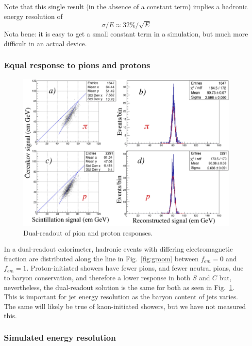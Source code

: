 Note that this single result (in the absence of a constant term) implies a hadronic energy resolution of
\begin{displaymath}
  \sigma / E \approx 32\% / \sqrt{E}
\end{displaymath}
Nota bene: it is easy to get a small constant term in a simulation, but much more difficult in an actual device.

\subsubsection{Equal response to pions and protons}
\label{sec:pi-p}

\begin{figure}
 \centering
 \includegraphics[width=.5\linewidth]{Calorimeter/DualReadout/f42-pion-proton.jpg}
 \caption{Dual-readout of pion and proton responses.}
 \label{fig:pi-p}
\end{figure}

In a dual-readout calorimeter, hadronic events with differing
electromagnetic fraction are distributed along the line in Fig.~\ref{fig:groom} between $f_{em}=0$ and $f_{em}=1$.  Proton-initiated
showers have fewer pions, and fewer neutral pions, due to baryon conservation, and therefore a lower response in both $S$ and $C$ but,
nevertheless, the dual-readout solution is the same for both as seen in Fig.~\ref{fig:pi-p}.  This is important for jet energy resolution as the baryon  
content of jets varies.  The same will likely be true of kaon-initiated showers, but we have not measured this. 

\subsubsection{Simulated energy resolution}
\label{sec:Eres}  

